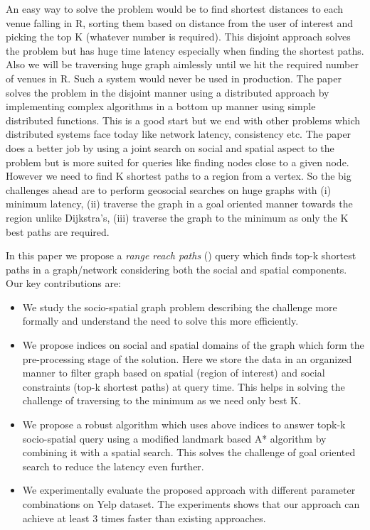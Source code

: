 An easy way to solve the problem would be to find shortest distances to each venue falling in R, sorting them based on distance from the user of interest and picking the top K (whatever number is required). This disjoint approach solves the problem but has huge time latency especially when finding the shortest paths. Also we will be traversing huge graph aimlessly until we hit the required number of venues in R. Such a system would never be used in production. The paper~\cite{NSD2013} solves the problem in the disjoint manner using a distributed approach by implementing complex algorithms in a bottom up manner using simple distributed functions. This is a good start but we end with other problems which distributed systems face today like network latency, consistency etc. The paper~\cite{KJY+2015} does a better job by using a joint search on social and spatial aspect to the problem but is more suited for queries like finding nodes close to a given node. However we need to find K shortest paths to a region from a vertex. So the big challenges ahead are to perform geosocial searches on huge graphs with (i) minimum latency, (ii) traverse the graph in a goal oriented manner towards the region unlike Dijkstra's, (iii) traverse the graph to the minimum as only the K best paths are required.

In this paper we propose a \textit{range reach paths} ({\rrp}) query which finds top-k shortest paths in a graph/network considering both the social and spatial components. Our key contributions are:
\begin{itemize}
	\item We study the socio-spatial graph problem describing the challenge more formally and understand the need to solve this more efficiently.
	\item We propose indices on social and spatial domains of the graph which form the pre-processing stage of the solution. Here we store the data in an organized manner to filter graph based on spatial (region of interest) and social constraints (top-k shortest paths) at query time. This helps in solving the challenge of traversing to the minimum as we need only best K.
	\item We propose a robust algorithm which uses above indices to answer topk-k socio-spatial query using a modified landmark based A* algorithm by combining it with a spatial search. This solves the challenge of goal oriented search to reduce the latency even further.
	\item We experimentally evaluate the proposed approach with different parameter combinations on Yelp dataset. The experiments shows that our approach can achieve at least 3 times faster than existing approaches.
\end{itemize}


